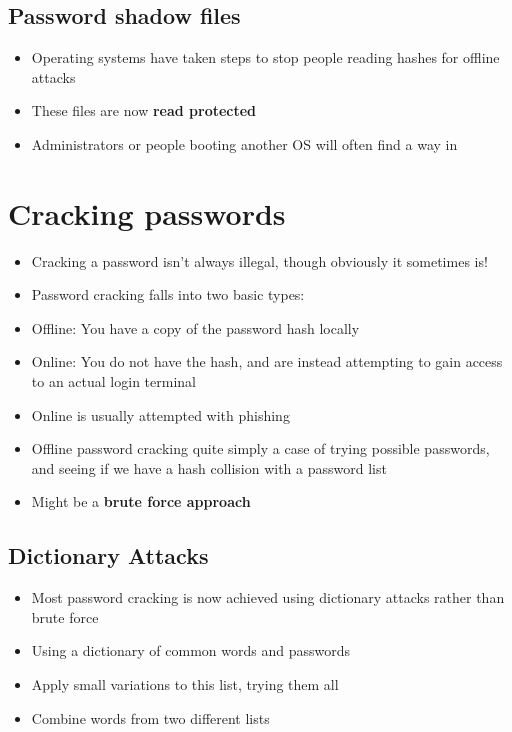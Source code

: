 \documentclass{article}
\begin{document}
\subsection{Password shadow files}
\begin{itemize}
  \item Operating systems have taken steps to stop people reading hashes for offline attacks 
  \item These files are now \textbf{read protected }
  \item Administrators or people booting another OS will often find a way in
\end{itemize}

\section{Cracking passwords}
\begin{itemize}
  \item Cracking a password isn’t always illegal, though obviously it sometimes is! 
  \item Password cracking falls into two basic types: 
  \item Offline: You have a copy of the password hash locally 
  \item Online: You do not have the hash, and are instead attempting to gain access to an actual login terminal 
  \item Online is usually attempted with phishing
  \item Offline password cracking quite simply a case of trying possible passwords, and seeing if we have a hash collision with a password list 
  \item Might be a \textbf{brute force approach}
\end{itemize}

\subsection{Dictionary Attacks}
\begin{itemize}
  \item Most password cracking is now achieved using dictionary attacks rather than brute force 
  \item Using a dictionary of common words and passwords 
  \item Apply small variations to this list, trying them all 
  \item Combine words from two different lists
\end{itemize}
\end{document}
